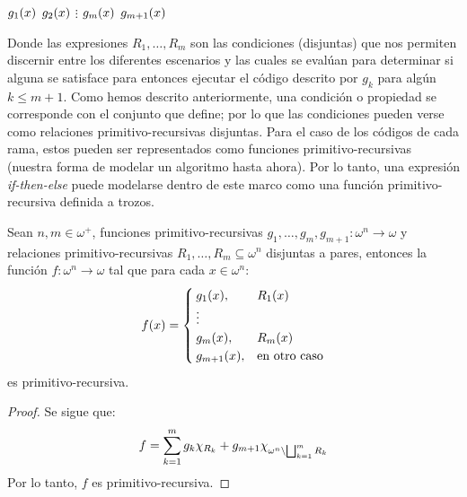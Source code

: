 \begin{algorithm}[h!]
	\caption{\emph{if-then-else}}

	\begin{algorithmic}
		\State \Return $g_{1}\pa*{x}$
		\State\Return $g_{2}\pa*{x}$
		\State $\vdots$
		\State\Return $g_{m}\pa*{x}$
		\Else
		\State\Return $g_{m + 1}\pa*{x}$
		\EndIf
	\end{algorithmic}
\end{algorithm}

Donde las expresiones $R_1,\dotsc, R_m$ son las condiciones (disjuntas) que nos permiten discernir entre los diferentes escenarios y las cuales se evalúan para determinar si alguna se satisface para entonces ejecutar el código descrito por $g_k$ para algún $k\leq m + 1$. Como hemos descrito anteriormente, una condición o propiedad se corresponde con el conjunto que define; por lo que las condiciones pueden verse como relaciones primitivo-recursivas disjuntas. Para el caso de los códigos de cada rama, estos pueden ser representados como funciones primitivo-recursivas (nuestra forma de modelar un algoritmo hasta ahora). Por lo tanto, una expresión \emph{if-then-else} puede modelarse dentro de este marco como una función primitivo-recursiva definida a trozos.

\begin{theorem}
	\label{theo: definicion_por_casos} %
	Sean $n, m\in\omega^{+}$, funciones primitivo-recursivas $g_{1},\dotsc, g_{m}, g_{m + 1}:\omega^{n}\to\omega$ y relaciones primitivo-recursivas $R_{1},\dotsc, R_{m}\subseteq\omega^{n}$ disjuntas a pares, entonces la función $f:\omega^{n}\to\omega$ tal que para cada $x\in\omega^{n}$:
	\[
		f\pa*{x} =
		\begin{cases}
			g_{1}\pa*{x}, & R_{1}\pa*{x}\\
			\vdots\\
			g_{m}\pa*{x}, & R_{m}\pa*{x}\\
			g_{m + 1}\pa*{x}, &\text{en otro caso}
		\end{cases}
	\]
	es primitivo-recursiva.
\end{theorem}

\begin{proof}
	Se sigue que:
	\[
		f =\sum_{k = 1}^{m}g_{k}\chi_{R_{k}} + g_{m + 1}\chi_{\omega^{n}\setminus\bigsqcup_{k = 1}^{m}R_{k}}
	\]
	Por lo tanto, $f$ es primitivo-recursiva.
\end{proof}

